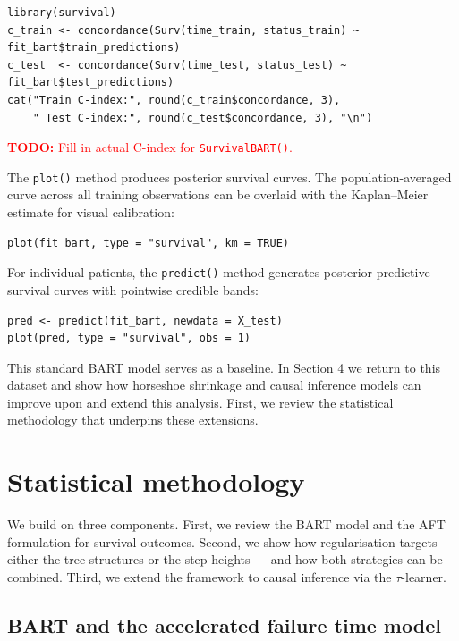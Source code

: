 \begin{verbatim}
library(survival)
c_train <- concordance(Surv(time_train, status_train) ~ fit_bart$train_predictions)
c_test  <- concordance(Surv(time_test, status_test) ~ fit_bart$test_predictions)
cat("Train C-index:", round(c_train$concordance, 3),
    " Test C-index:", round(c_test$concordance, 3), "\n")
\end{verbatim}

\textcolor{red}{\textbf{TODO:} Fill in actual C-index for \texttt{SurvivalBART()}.}

The \texttt{plot()} method produces posterior survival curves. The population-averaged curve across all training observations can be overlaid with the Kaplan--Meier estimate for visual calibration:

\begin{verbatim}
plot(fit_bart, type = "survival", km = TRUE)
\end{verbatim}

For individual patients, the \texttt{predict()} method generates posterior predictive survival curves with pointwise credible bands:

\begin{verbatim}
pred <- predict(fit_bart, newdata = X_test)
plot(pred, type = "survival", obs = 1)
\end{verbatim}

This standard BART model serves as a baseline. In Section 4 we return to this dataset and show how horseshoe shrinkage and causal inference models can improve upon and extend this analysis. First, we review the statistical methodology that underpins these extensions.

\section{Statistical methodology}\label{statistical-methodology}

We build on three components. First, we review the BART model and the AFT formulation for survival outcomes. Second, we show how regularisation targets either the tree structures or the step heights --- and how both strategies can be combined. Third, we extend the framework to causal inference via the \(\tau\)-learner.

\subsection{BART and the accelerated failure time model}\label{bart-and-the-accelerated-failure-time-model}

